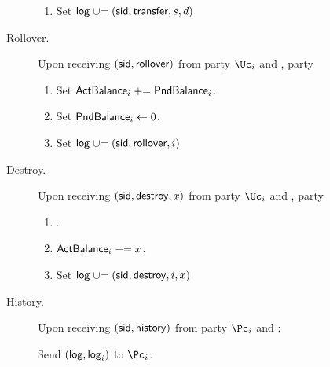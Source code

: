 \begin{functionality}
\begin{description}
\begin{enumerate}
			\item Set $\mathsf{log} \mathrel{\cup}= {(\mathsf{sid},\mathsf{transfer},s,d)}$
			
		\end{enumerate}
		
		\item[Rollover.]     Upon receiving $(\mathsf{sid},\mathsf{rollover})$ from  party $\Uc_i$ and \Cc,  party \Cc
		
		\begin{enumerate}
			
			
			\item Set $\mathsf{ActBalance}_i  \mathrel{+}= \mathsf{PndBalance}_i$.
			
			\item Set $\mathsf{PndBalance}_i  \leftarrow 0$.
			
			\item Set $\mathsf{log} \mathrel{\cup}= (\mathsf{sid},\mathsf{rollover},i)$
			
			
		\end{enumerate}

		
			\item[Destroy.]     Upon receiving $(\mathsf{sid},\mathsf{destroy},x)$ from  party $\Uc_i$ and \Cc,  party \Cc
		
		\begin{enumerate}
			
			
			 \item \Assert{$x\in \N$, $\balance_i  \ge x$ and $i \in [n]$}.
			
			\item $\mathsf{ActBalance}_i \mathrel{-}= x$.
			
			
			\item Set $\mathsf{log} \mathrel{\cup}= {(\mathsf{sid},\mathsf{destroy},i,x)}$
			
			
		\end{enumerate}
		
		
		\item[History.]     Upon receiving $(\mathsf{sid},\mathsf{history})$ from  party $\Pc_i$ and \Cc:  
		
		Send $(\mathsf{log},\mathsf{log}_i)$ to  $\Pc_i$.	 
		
	\end{description}

\end{functionality}

